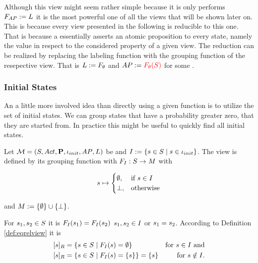 \documentclass[preview]{standalone}
\begin{document}
Although this view might seem rather simple because it is only performs ${{F_{{AP}}}} := {L}$ it is the most powerful one of all the views that will be shown later on. This is because every view presented in the following is reducible to this one. That is because a \grpfctN essentially asserts an atomic proposition to every state, namely the value in respect to the considered property of a given view. The reduction can be realized by replacing the labeling function with the grouping function of the resepective view. That is ${L} := {F_{{\theta}}}$ and ${AP} := {\color{red}{F_{\ensuremath{{\theta}}}}({S})}$ for some \grpfctN \grpfct.

\subsubsection{Initial States}
An a little more involved idea than directly using a given function is to utilize the set of initial states. We can group states that have a probability greater zero, that they are started from. In practice this might be useful to quickly find all initial states.

\begin{definition}
	Let ${{{\mathcal{M}}}} = {{({S}, {Act}, {\textbf{P}}, {\iota_{init}}, {AP}, {L})}}$ be \chosengraphtypeN and ${I} := \{{s} \in {S} \mid {s} \in {\ensuremath{{\iota_{init}}}}\}$. The view \viewinitstates is defined by its grouping function \gfctinitstates \grpfctN with ${{F_{{I}}}} : {S} \to {\ensuremath{{M}}}$ with 
	
	\[
	{s} \mapsto
	\begin{cases}
		\emptyset,				& \text{if } {s} \in {I} \\
		{\bot},          	& \text{otherwise}
	\end{cases}
	\]
	
	and ${{M}} := \{\emptyset\} \cup {\{\bot\}}$.
\end{definition}

For ${s}_1,{s}_2 \in {S}$ it is ${{F_{{I}}}}({s}_1) = {{F_{{I}}}}({s}_2)$ \iffN ${s}_1, {s}_2 \in {I}$ or ${s}_1 = {s}_2$. According to Definition \ref{def:eqrelview} it is 
\begin{align*}
	{\ensuremath{{[{s}]_{{R}}}}} &= \{{s} \in {S} \mid {\ensuremath{{F_{{I}}}}}({s}) = \emptyset\} &\text{for } {s} \in {I} \text{ and} \\
	{{[{s}]_{{R}}}} &= \{{s} \in {S} \mid {\ensuremath{{F_{{I}}}}}({s}) = \{{s}\} \} = \{{s}\} &\text{for } {s} \notin {I}.
\end{align*}
\end{document}
